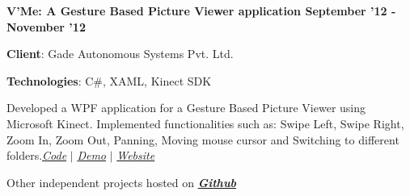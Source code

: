 \documentclass[10pt]{article}
\newenvironment{innerlist}[1][\enskip\textbullet]%
        {\begin{compactitem}[#1]}{\end{compactitem}}
\newcommand{\blankline}{\vspace*{0pt}}
\begin{document}
\small \textbf{V'Me: A Gesture Based Picture Viewer application \hfill September '12 - November '12} \normalsize
\begin{innerlist}
\item[] \textbf{Client}: Gade Autonomous Systems Pvt. Ltd.
\item[] \textbf{Technologies}: C\#, XAML, Kinect SDK
\item[] Developed a WPF application for a Gesture Based Picture Viewer using Microsoft Kinect. Implemented functionalities such as: Swipe Left, Swipe Right, Zoom In, Zoom Out, Panning, Moving mouse cursor and Switching to different folders.\hfill \small \href{http://github.com/karanjthakkar/Gesture-Based-Picture-Viewer}{\textit{Code}} $|$ \href{http://youtu.be/v8SumS-I1qo}{\textit{Demo}} $|$ \href{http://autonomous-systems.in/#vme}{\textit{Website}} \normalsize
\end{innerlist}

\vspace{8pt}

Other independent projects hosted on \href{http://github.com/karanjthakkar}{\textit{\textbf{Github} } }

\blankline
\end{document}
